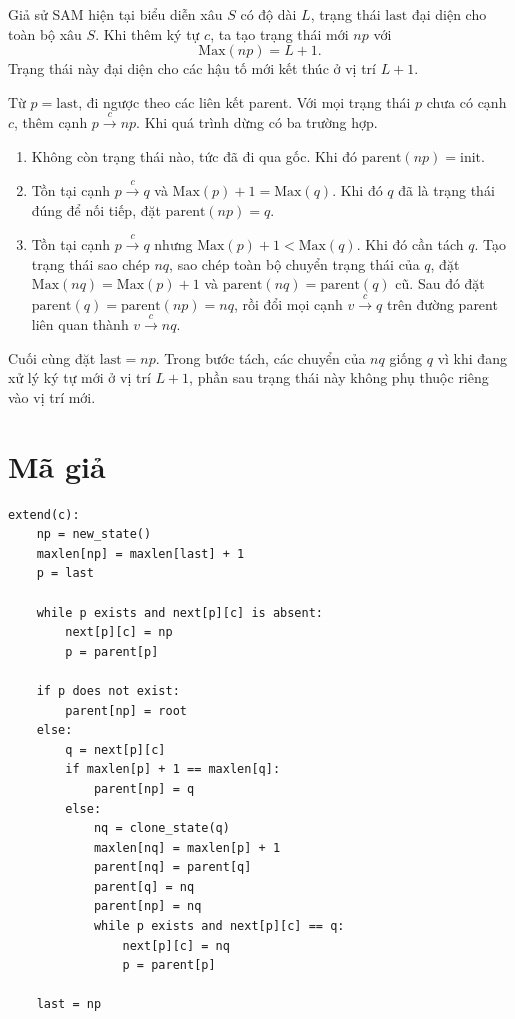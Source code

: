 \documentclass[11pt]{article}
\begin{document}
Giả sử SAM hiện tại biểu diễn xâu $S$ có độ dài $L$, trạng thái
$\mathrm{last}$ đại diện cho toàn bộ xâu $S$.  Khi thêm ký tự $c$, ta tạo trạng
thái mới $np$ với
\[
  \mathrm{Max}(np)=L+1.
\]
Trạng thái này đại diện cho các hậu tố mới kết thúc ở vị trí $L+1$.

Từ $p=\mathrm{last}$, đi ngược theo các liên kết parent.  Với mọi trạng thái
$p$ chưa có cạnh $c$, thêm cạnh $p \xrightarrow{c} np$.  Khi quá trình dừng có
ba trường hợp.

\begin{enumerate}
  \item Không còn trạng thái nào, tức đã đi qua gốc.  Khi đó
  $\mathrm{parent}(np)=\mathrm{init}$.

  \item Tồn tại cạnh $p \xrightarrow{c} q$ và
  $\mathrm{Max}(p)+1=\mathrm{Max}(q)$.  Khi đó $q$ đã là trạng thái đúng để nối
  tiếp, đặt $\mathrm{parent}(np)=q$.

  \item Tồn tại cạnh $p \xrightarrow{c} q$ nhưng
  $\mathrm{Max}(p)+1<\mathrm{Max}(q)$.  Khi đó cần tách $q$.  Tạo trạng thái
  sao chép $nq$, sao chép toàn bộ chuyển trạng thái của $q$, đặt
  $\mathrm{Max}(nq)=\mathrm{Max}(p)+1$ và
  $\mathrm{parent}(nq)=\mathrm{parent}(q)$ cũ.  Sau đó đặt
  $\mathrm{parent}(q)=\mathrm{parent}(np)=nq$, rồi đổi mọi cạnh
  $v \xrightarrow{c} q$ trên đường parent liên quan thành
  $v \xrightarrow{c} nq$.
\end{enumerate}

Cuối cùng đặt $\mathrm{last}=np$.  Trong bước tách, các chuyển của $nq$ giống
$q$ vì khi đang xử lý ký tự mới ở vị trí $L+1$, phần sau trạng thái này không
phụ thuộc riêng vào vị trí mới.

\section{Mã giả}

\begin{verbatim}
extend(c):
    np = new_state()
    maxlen[np] = maxlen[last] + 1
    p = last

    while p exists and next[p][c] is absent:
        next[p][c] = np
        p = parent[p]

    if p does not exist:
        parent[np] = root
    else:
        q = next[p][c]
        if maxlen[p] + 1 == maxlen[q]:
            parent[np] = q
        else:
            nq = clone_state(q)
            maxlen[nq] = maxlen[p] + 1
            parent[nq] = parent[q]
            parent[q] = nq
            parent[np] = nq
            while p exists and next[p][c] == q:
                next[p][c] = nq
                p = parent[p]

    last = np
\end{verbatim}
\end{document}
